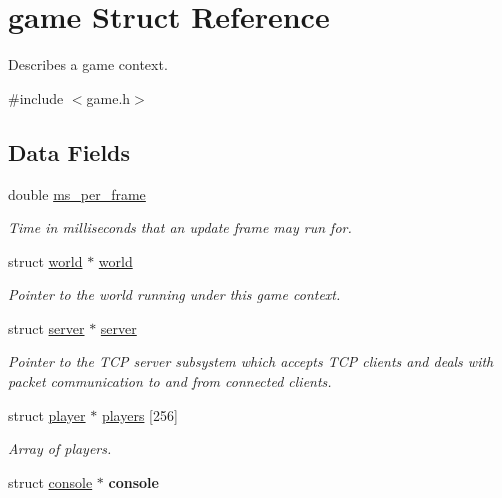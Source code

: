 \hypertarget{structgame}{}\section{game Struct Reference}
\label{structgame}


Describes a game context.  




{\ttfamily \#include $<$game.\+h$>$}

\subsection*{Data Fields}
\begin{DoxyCompactItemize}
\item 
double \hyperlink{structgame_aa9d50b55cf6dae7b73b4a451ba683f19}{ms\+\_\+per\+\_\+frame}
\begin{DoxyCompactList}\small\item\em Time in milliseconds that an update frame may run for. \end{DoxyCompactList}\item 
\hypertarget{structgame_a4035dec91063bfca4b7fb004e33c29ef}{}struct \hyperlink{structworld}{world} $\ast$ \hyperlink{structgame_a4035dec91063bfca4b7fb004e33c29ef}{world}\label{structgame_a4035dec91063bfca4b7fb004e33c29ef}

\begin{DoxyCompactList}\small\item\em Pointer to the world running under this game context. \end{DoxyCompactList}\item 
\hypertarget{structgame_aea9cf90d2855a6a1e88d2f87e1a753f0}{}struct \hyperlink{structserver}{server} $\ast$ \hyperlink{structgame_aea9cf90d2855a6a1e88d2f87e1a753f0}{server}\label{structgame_aea9cf90d2855a6a1e88d2f87e1a753f0}

\begin{DoxyCompactList}\small\item\em Pointer to the T\+C\+P server subsystem which accepts T\+C\+P clients and deals with packet communication to and from connected clients. \end{DoxyCompactList}\item 
struct \hyperlink{structplayer}{player} $\ast$ \hyperlink{structgame_ac35cf57540b1ffe43f32ed655711b0d0}{players} \mbox{[}256\mbox{]}
\begin{DoxyCompactList}\small\item\em Array of players. \end{DoxyCompactList}\item 
\hypertarget{structgame_a396c1ac8c8319a43e70d37e2a49193d1}{}struct \hyperlink{structconsole}{console} $\ast$ {\bfseries console}\label{structgame_a396c1ac8c8319a43e70d37e2a49193d1}


\end{DoxyCompactItemize}
